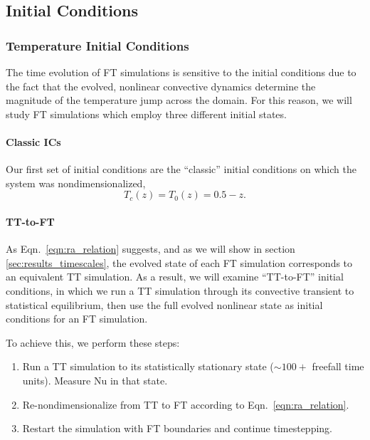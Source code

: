 \documentclass[aps, pre, onecolumn, nofootinbib, notitlepage, groupedaddress, amsfonts, amssymb, amsmath, longbibliography, superscriptaddress]{revtex4-1}
\newcommand{\ea}[1]{{\color{red} #1}}
\begin{document}
\ea{
\subsection{Initial Conditions}

\subsubsection{Temperature Initial Conditions}

The time evolution of FT simulations is sensitive to the initial conditions due to the fact that the evolved, nonlinear convective dynamics determine the magnitude of the temperature jump across the domain.
For this reason, we will study FT simulations which employ three different initial states.

\paragraph{Classic ICs} 
Our first set of initial conditions are the ``classic'' initial conditions on which the system was nondimensionalized,
\begin{equation}
T_c(z) = T_0(z) = 0.5 - z.
\end{equation}

\paragraph{TT-to-FT}
As Eqn.~\ref{eqn:ra_relation} suggests, and as we will show in section \ref{sec:results_timescales}, the evolved state of each FT simulation corresponds to an equivalent TT simulation.
As a result, we will examine ``TT-to-FT'' initial conditions, in which we run a TT simulation through its convective transient to statistical equilibrium, then use the full evolved nonlinear state as initial conditions for an FT simulation.
}
To achieve this, we perform these steps:
\begin{enumerate}
\item Run a TT simulation to its statistically stationary state ($\sim100+$ freefall time units). 
Measure $\text{Nu}$ in that state.
\item Re-nondimensionalize from TT to FT according to Eqn.~\ref{eqn:ra_relation}.
\item Restart the simulation with FT boundaries and continue timestepping.
\end{enumerate}
\end{document}
